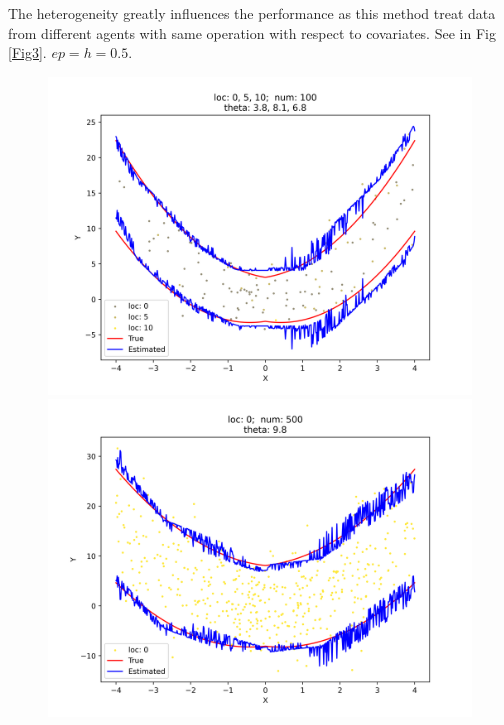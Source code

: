 \documentclass[12pt, a4paper, oneside]{article}
\begin{document}
    The heterogeneity greatly influences the performance as this method treat data from different agents with same operation with respect to covariates. See in Fig \ref{Fig3}. $ep=h=0.5$.
    \begin{figure}[htbp]
        \centering
        \begin{minipage}{0.495\linewidth}
            \centering
            \includegraphics[width=0.98\linewidth]{fig/Ex1_2/0_5_10.png}
        \end{minipage}
        \begin{minipage}{0.495\linewidth}
            \centering
            \includegraphics[width=0.98\linewidth]{fig/Ex1_2/0}
        \end{minipage}
        \centering
        \begin{minipage}{0.495\linewidth}

\end{minipage}
\end{figure}
\end{document}
